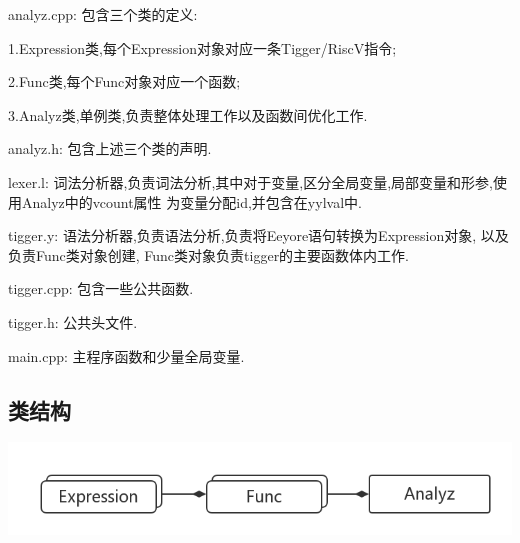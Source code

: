 \documentclass[UTF8]{article}
\begin{document}
analyz.cpp: 包含三个类的定义: 

	1.Expression类,每个Expression对象对应一条Tigger/RiscV指令;
	
	2.Func类,每个Func对象对应一个函数; 
	
	3.Analyz类,单例类,负责整体处理工作以及函数间优化工作. 

analyz.h: 包含上述三个类的声明.

lexer.l: 词法分析器,负责词法分析,其中对于变量,区分全局变量,局部变量和形参,使用Analyz中的vcount属性
为变量分配id,并包含在yylval中.

tigger.y: 语法分析器,负责语法分析,负责将Eeyore语句转换为Expression对象, 以及负责Func类对象创建, Func类对象负责tigger的主要函数体内工作.

tigger.cpp: 包含一些公共函数.

tigger.h: 公共头文件.

main.cpp: 主程序函数和少量全局变量.
\subsection{类结构}
\includegraphics[width=0.7\linewidth]{uml} 
\end{document}
